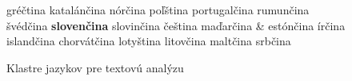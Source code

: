 \begin{multicols}{2}
\begin{figure}[h!]
\begin{tabular}
  gréčtina \newline 
  katalánčina \newline 
  nórčina \newline 
  poľština \newline 
  portugalčina \newline 
  rumunčina \newline 
  švédčina \newline 
  \textbf{slovenčina} \newline 
  slovinčina \newline 
  čeština \newline 
  maďarčina \newline 
& \vspace*{0.5mm}estónčina \newline 
  írčina \newline 
  islandčina \newline 
  chorvátčina \newline 
  lotyština \newline 
  litovčina \newline 
  maltčina \newline 
  srbčina \\
  \end{tabular}
\label{fig:text_cluster_sk}
\caption{Klastre jazykov pre textovú analýzu}
\end{figure}


\end{multicols}
